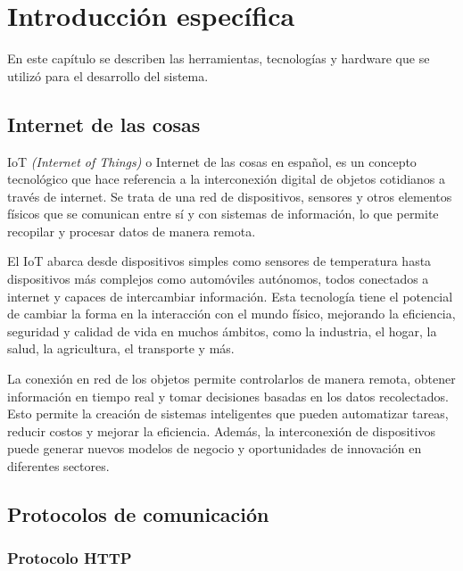 \chapter{Introducción específica} %

\label{Chapter2}

En este capítulo se describen las herramientas, tecnologías y hardware que se utilizó para el desarrollo del sistema.

\section{Internet de las cosas}
\label{sec:iot}

IoT \cite{WEBSITE:iot-org-ar} \textit{(Internet of Things)} o Internet de las cosas en español, es un concepto tecnológico que hace referencia a la interconexión digital de objetos cotidianos a través de internet. Se trata de una red de dispositivos, sensores y otros elementos físicos que se comunican entre sí y con sistemas de información, lo que permite recopilar y procesar datos de manera remota.

El IoT abarca desde dispositivos simples como sensores de temperatura hasta dispositivos más complejos como automóviles autónomos, todos conectados a internet y capaces de intercambiar información. Esta tecnología tiene el potencial de cambiar la forma en la interacción con el mundo físico, mejorando la eficiencia, seguridad y calidad de vida en muchos ámbitos, como la industria, el hogar, la salud, la agricultura, el transporte y más.

La conexión en red de los objetos permite controlarlos de manera remota, obtener información en tiempo real y tomar decisiones basadas en los datos recolectados. Esto permite la creación de sistemas inteligentes que pueden automatizar tareas, reducir costos y mejorar la eficiencia. Además, la interconexión de dispositivos puede generar nuevos modelos de negocio y oportunidades de innovación en diferentes sectores.

\section{Protocolos de comunicación}
\label{sec:protocolos}

\subsection{Protocolo HTTP}

